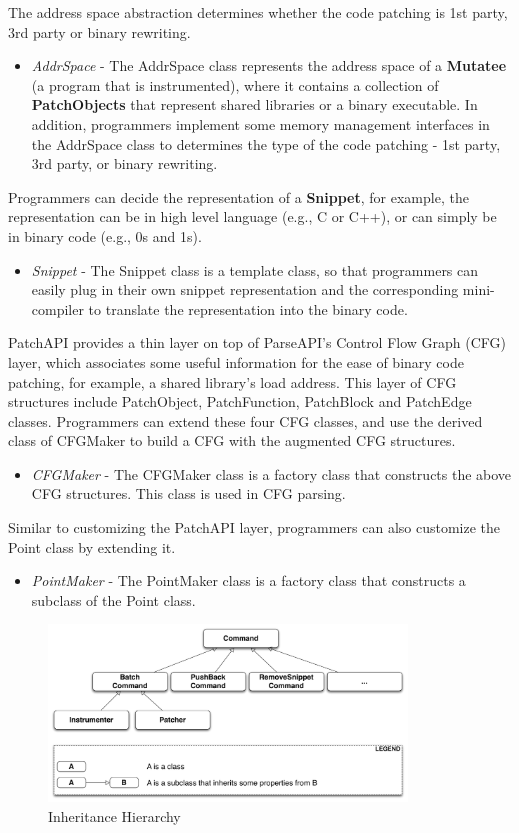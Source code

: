 The address space abstraction determines whether the code patching is 1st party,
3rd party or binary rewriting.
\begin{itemize}
\item \emph{AddrSpace} - The AddrSpace class represents the address space of a
  \textbf{Mutatee} (a program that is instrumented), where it contains a
  collection of \textbf{PatchObjects} that represent shared libraries or a
  binary executable. In addition, programmers implement some memory management
  interfaces in the AddrSpace class to determines the type of the code patching
  - 1st party, 3rd party, or binary rewriting.
\end{itemize}
Programmers can decide the representation of a \textbf{Snippet}, for example, the
representation can be in high level language (e.g., C or C++), or can simply be
in binary code (e.g., 0s and 1s).
\begin{itemize}
\item \emph{Snippet} - The Snippet class is a template class, so that programmers can
    easily plug in their own snippet representation and the corresponding
    mini-compiler to translate the representation into the binary code.
\end{itemize}
PatchAPI provides a thin layer on top of ParseAPI's Control Flow Graph (CFG)
layer, which associates some useful information for the ease of binary code
patching, for example, a shared library's load address. This layer of CFG
structures include PatchObject, PatchFunction, PatchBlock and PatchEdge classes.
Programmers can extend these four CFG classes, and use the derived class of
CFGMaker to build a CFG with the augmented CFG structures.

\begin{itemize}
\item \emph{CFGMaker} - The CFGMaker class is a factory class that constructs the above
    CFG structures. This class is used in CFG parsing.
\end{itemize}

Similar to customizing the PatchAPI layer, programmers can also customize the
Point class by extending it.
\begin{itemize}
\item \emph{PointMaker} - The PointMaker class is a factory class that
  constructs a subclass of the Point class.
\end{itemize}


\begin{figure}[ht!]
\centerline{\includegraphics[width=0.85\textwidth]{./figure/command/img.pdf}}
\caption{\label{fig:inh}Inheritance Hierarchy}
\end{figure}

